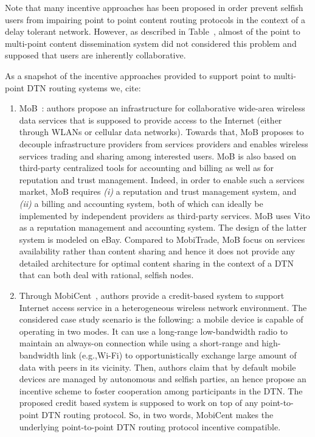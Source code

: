 Note that many incentive approaches has been proposed in order prevent selfish users from impairing point to point content routing protocols in the context of a delay tolerant network. However, as described in Table~\cite{DisseminationSummary}, almost of the point to multi-point content dissemination system did not considered this problem and supposed that users are inherently collaborative.

As a snapshot of the incentive approaches provided to support point to multi-point DTN routing systems we, cite:
\begin{enumerate}

\item MoB~\cite{MoB}: authors propose an infrastructure for collaborative wide-area wireless data services that is supposed to provide access to the Internet (either through WLANs or cellular data networks). Towards that,  MoB proposes to decouple infrastructure providers from services providers and enables wireless services trading and sharing among interested users. MoB is also based on third-party centralized tools for accounting and billing as well as for reputation and trust management. Indeed, in order to enable such a services market, MoB requires \emph{(i)} a reputation and trust management system, and \emph{(ii)} a billing and accounting system, both of which can ideally be implemented by independent providers as third-party services. MoB uses Vito as a reputation management and accounting system. The design of the latter system is modeled on eBay. Compared to MobiTrade, MoB focus on services availability rather than content sharing and hence it does not provide any detailed architecture for optimal content sharing in the context of a DTN that can both deal with rational, selfish nodes.

\item Through MobiCent~\cite{MobiCent}, authors provide a credit-based system to support Internet access service in a heterogeneous wireless network environment. The considered case study scenario is the following: a mobile device is capable of operating in two modes. It can use a long-range low-bandwidth radio to maintain an always-on connection while using a short-range and high-bandwidth link (e.g.,Wi-Fi) to opportunistically exchange large amount of data with peers in its vicinity. Then, authors
claim that by default mobile devices are managed by autonomous and selfish parties, an hence propose an incentive scheme to foster cooperation among participants in the DTN. The proposed credit based system is supposed to work on top of any point-to-point DTN routing protocol. So, in two words, MobiCent makes the underlying point-to-point DTN routing protocol incentive compatible. 


\end{enumerate}
